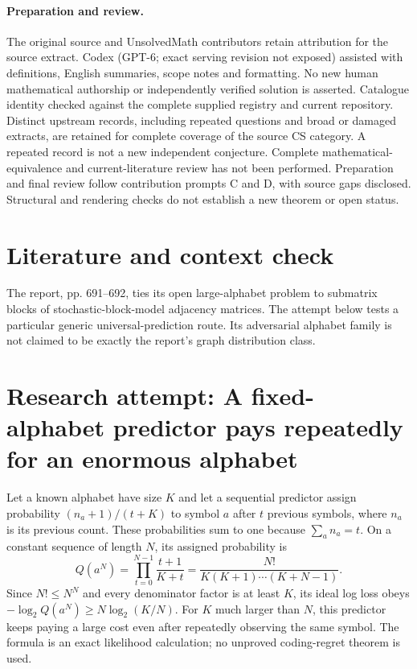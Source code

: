 \documentclass[11pt]{article}
\begin{document}
\paragraph{Preparation and review.}
The original source and UnsolvedMath contributors retain attribution for the source extract. Codex (GPT-6; exact serving revision not exposed) assisted with definitions, English summaries, scope notes and formatting. No new human mathematical authorship or independently verified solution is asserted. Catalogue identity checked against the complete supplied registry and current repository. Distinct upstream records, including repeated questions and broad or damaged extracts, are retained for complete coverage of the source CS category. A repeated record is not a new independent conjecture. Complete mathematical-equivalence and current-literature review has not been performed. Preparation and final review follow contribution prompts C and D, with source gaps disclosed. Structural and rendering checks do not establish a new theorem or open status.
\label{end:statement}

\section{Literature and context check}
The report, pp. 691--692, ties its open large-alphabet problem to submatrix blocks of stochastic-block-model adjacency matrices. The attempt below tests a particular generic universal-prediction route. Its adversarial alphabet family is not claimed to be exactly the report's graph distribution class.
\section{Research attempt: A fixed-alphabet predictor pays repeatedly for an enormous alphabet}
Let a known alphabet have size $K$ and let a sequential predictor assign probability $(n_a+1)/(t+K)$ to symbol $a$ after $t$ previous symbols, where $n_a$ is its previous count. These probabilities sum to one because $\sum_a n_a=t$. On a constant sequence of length $N$, its assigned probability is
\[
Q(a^N)=\prod_{t=0}^{N-1}\frac{t+1}{K+t}
=\frac{N!}{K(K+1)\cdots(K+N-1)}.
\]
Since $N!\le N^N$ and every denominator factor is at least $K$, its ideal log loss obeys $-\log_2 Q(a^N)\ge N\log_2(K/N)$. For $K$ much larger than $N$, this predictor keeps paying a large cost even after repeatedly observing the same symbol. The formula is an exact likelihood calculation; no unproved coding-regret theorem is used.
\end{document}
